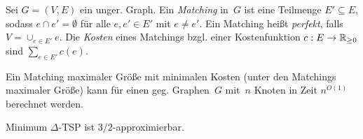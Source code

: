 \documentclass{cheat-sheet}
\begin{document}
\begin{defn}
  Sei $G = (V, E)$ ein unger. Graph.
  Ein \emph{Matching} in~$G$ ist eine Teilmenge $E' \subseteq E$, sodass $e \cap e' = \emptyset$ für alle $e, e' \in E'$ mit $e \neq e'$.
  Ein Matching heißt \emph{perfekt}, falls $V = \cup_{e \in E'} e$.
  Die \textit{Kosten} eines Matchings bzgl. einer Kostenfunktion $c : E \to \mathbb{R}_{\geq 0}$ sind ${\sum}_{e \in E'} c(e)$.
\end{defn}

\begin{satz}
  Ein Matching maximaler Größe mit minimalen Kosten (unter den Matchings maximaler Größe) kann für einen geg. Graphen~$G$ mit~$n$ Knoten in Zeit $n^{O(1)}$ berechnet werden.
\end{satz}

\begin{satz}
  Minimum $\Delta$-TSP ist $3/2$-approximierbar.
\end{satz}
\end{document}
